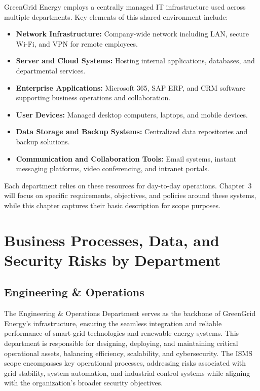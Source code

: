 GreenGrid Energy employs a centrally managed \ac{IT} infrastructure used across multiple
departments. Key elements of this shared environment include:
\begin{itemize}
    \item \textbf{Network Infrastructure:} Company-wide network including
          \ac{LAN}, secure Wi-Fi, and \ac{VPN} for remote employees.
    \item \textbf{Server and Cloud Systems:} Hosting internal
          applications, databases, and departmental services.
    \item \textbf{Enterprise Applications:} Microsoft 365, SAP \ac{ERP},
          and \ac{CRM} software supporting business operations and collaboration.
    \item \textbf{User Devices:} Managed desktop computers, laptops, and
          mobile devices.
    \item \textbf{Data Storage and Backup Systems:} Centralized data
          repositories and backup solutions.
    \item \textbf{Communication and Collaboration Tools:} Email systems,
          instant messaging platforms, video conferencing, and intranet portals.
\end{itemize}

Each department relies on these resources for day-to-day operations. Chapter~3 will focus
on specific requirements, objectives, and policies around these systems, while this chapter
captures their basic description for scope purposes.

\section{Business Processes, Data, and Security Risks by Department}

\subsection{Engineering \& Operations}

The Engineering \& Operations Department serves as the backbone of GreenGrid Energy's infrastructure, ensuring the seamless integration and reliable performance of smart-grid technologies and renewable energy systems. This department is responsible for designing, deploying, and maintaining critical operational assets, balancing efficiency, scalability, and cybersecurity. The \ac{ISMS} scope encompasses key operational processes, addressing risks associated with grid stability, system automation, and industrial control systems while aligning with the organization's broader security objectives.


